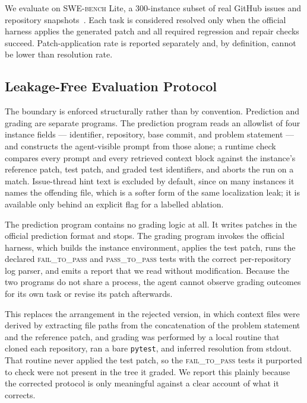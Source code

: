 \documentclass[journal]{IEEEtran}
\newcommand{\swebench}{\textsc{SWE-bench}}
\begin{document}
We evaluate on \swebench{} Lite, a 300-instance subset of real GitHub issues and repository snapshots~\cite{jimenez2024swebench}. Each task is considered resolved only when the official harness applies the generated patch and all required regression and repair checks succeed. Patch-application rate is reported separately and, by definition, cannot be lower than resolution rate.

\subsection{Leakage-Free Evaluation Protocol}

The boundary is enforced structurally rather than by convention. Prediction and grading are separate programs. The prediction program reads an allowlist of four instance fields — identifier, repository, base commit, and problem statement — and constructs the agent-visible prompt from those alone; a runtime check compares every prompt and every retrieved context block against the instance's reference patch, test patch, and graded test identifiers, and aborts the run on a match. Issue-thread hint text is excluded by default, since on many instances it names the offending file, which is a softer form of the same localization leak; it is available only behind an explicit flag for a labelled ablation.

The prediction program contains no grading logic at all. It writes patches in the official prediction format and stops. The grading program invokes the official harness, which builds the instance environment, applies the test patch, runs the declared \textsc{fail\_to\_pass} and \textsc{pass\_to\_pass} tests with the correct per-repository log parser, and emits a report that we read without modification. Because the two programs do not share a process, the agent cannot observe grading outcomes for its own task or revise its patch afterwards.

This replaces the arrangement in the rejected version, in which context files were derived by extracting file paths from the concatenation of the problem statement and the reference patch, and grading was performed by a local routine that cloned each repository, ran a bare \texttt{pytest}, and inferred resolution from stdout. That routine never applied the test patch, so the \textsc{fail\_to\_pass} tests it purported to check were not present in the tree it graded. We report this plainly because the corrected protocol is only meaningful against a clear account of what it corrects.
\end{document}
